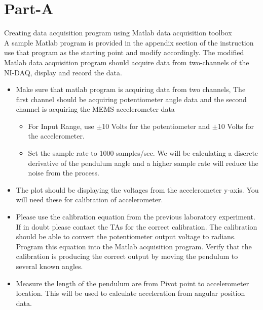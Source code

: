\documentclass{article} %
\begin{document}
\section{Part-A}
Creating data acquisition program using Matlab data acquisition toolbox\\
A sample Matlab program is provided in the appendix section of the instruction use that program as the starting point and modify accordingly. The modified Matlab data acquisition program should acquire data from two-channels of the NI-DAQ, display and record the data.
\begin{itemize}
\item Make sure that matlab program is acquiring data from two channels, The first channel should be acquiring  potentiometer angle data and the second channel is acquiring the MEMS accelerometer data
\begin{itemize}
\item For Input Range, use $\pm$10 Volts for the potentiometer and $\pm$10 Volts for the accelerometer.
\item Set the sample rate to 1000 samples/sec. We will be calculating a discrete derivative of the
pendulum angle and a higher sample rate will reduce the noise from the process.
\end{itemize}
\item  The plot should be displaying the voltages from the accelerometer y-axis. You will need these for calibration of accelerometer.
\item Please use the calibration equation from the previous laboratory experiment. If in doubt please contact the TAs for the correct calibration. The calibration should be able to convert the potentiometer output voltage
to radians. Program this equation into the Matlab acquisition program. Verify that the calibration is producing the correct output by moving the pendulum to several known angles.
\item Measure the length of the pendulum are from Pivot point to accelerometer location. This will be used to calculate acceleration from angular position data.
\end{itemize}
\end{document}
